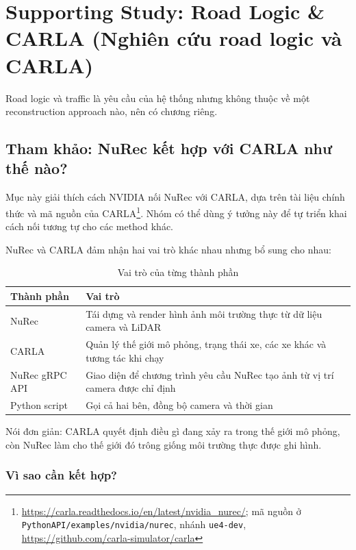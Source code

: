 \chapter{Supporting Study: Road Logic \& CARLA (Nghiên cứu road logic và CARLA)}

Road logic và traffic là yêu cầu của hệ thống nhưng không thuộc về một reconstruction approach nào, nên có chương riêng.

\section{Tham khảo: NuRec kết hợp với CARLA như thế nào?}

Mục này giải thích cách NVIDIA nối NuRec với CARLA, dựa trên tài liệu chính thức và mã nguồn của CARLA\footnote{\url{https://carla.readthedocs.io/en/latest/nvidia_nurec/}; mã nguồn ở \texttt{PythonAPI/examples/nvidia/nurec}, nhánh \texttt{ue4-dev}, \url{https://github.com/carla-simulator/carla}}.
Nhóm có thể dùng ý tưởng này để tự triển khai cách nối tương tự cho các method khác.

NuRec và CARLA đảm nhận hai vai trò khác nhau nhưng bổ sung cho nhau:

\begin{table}[H]
  \centering
  \caption{Vai trò của từng thành phần}
  \begin{tabularx}{\linewidth}{>{\raggedright\arraybackslash}p{3cm} X}
    \toprule
    \textbf{Thành phần} & \textbf{Vai trò} \\
    \midrule
    NuRec & Tái dựng và render hình ảnh môi trường thực từ dữ liệu camera và LiDAR \\
    \addlinespace
    CARLA & Quản lý thế giới mô phỏng, trạng thái xe, các xe khác và tương tác khi chạy \\
    \addlinespace
    NuRec gRPC API & Giao diện để chương trình yêu cầu NuRec tạo ảnh từ vị trí camera được chỉ định \\
    \addlinespace
    Python script & Gọi cả hai bên, đồng bộ camera và thời gian \\
    \bottomrule
  \end{tabularx}
\end{table}

Nói đơn giản: CARLA quyết định điều gì đang xảy ra trong thế giới mô phỏng, còn NuRec làm cho thế giới đó trông giống môi trường thực được ghi hình.

\subsection{Vì sao cần kết hợp?}

